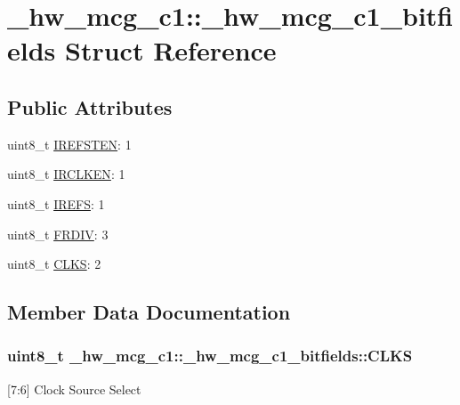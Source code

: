 \hypertarget{struct__hw__mcg__c1_1_1__hw__mcg__c1__bitfields}{}\section{\+\_\+hw\+\_\+mcg\+\_\+c1\+:\+:\+\_\+hw\+\_\+mcg\+\_\+c1\+\_\+bitfields Struct Reference}
\label{struct__hw__mcg__c1_1_1__hw__mcg__c1__bitfields}
\subsection*{Public Attributes}
\begin{DoxyCompactItemize}
\item 
uint8\+\_\+t \hyperlink{struct__hw__mcg__c1_1_1__hw__mcg__c1__bitfields_ac52aec473d5ce4658b1065a251a141a9}{I\+R\+E\+F\+S\+T\+EN}\+: 1
\item 
uint8\+\_\+t \hyperlink{struct__hw__mcg__c1_1_1__hw__mcg__c1__bitfields_a94895970d606eb7fe932690bb7e15215}{I\+R\+C\+L\+K\+EN}\+: 1
\item 
uint8\+\_\+t \hyperlink{struct__hw__mcg__c1_1_1__hw__mcg__c1__bitfields_ab02dab18adb0d367851196f271c603f3}{I\+R\+E\+FS}\+: 1
\item 
uint8\+\_\+t \hyperlink{struct__hw__mcg__c1_1_1__hw__mcg__c1__bitfields_ab887d1778352d8a2ca2ca5bfde5234c3}{F\+R\+D\+IV}\+: 3
\item 
uint8\+\_\+t \hyperlink{struct__hw__mcg__c1_1_1__hw__mcg__c1__bitfields_a9b0233157186c45e201ebe800772f6e3}{C\+L\+KS}\+: 2
\end{DoxyCompactItemize}


\subsection{Member Data Documentation}
\subsubsection[{\texorpdfstring{C\+L\+KS}{CLKS}}]{\setlength{\rightskip}{0pt plus 5cm}uint8\+\_\+t \+\_\+hw\+\_\+mcg\+\_\+c1\+::\+\_\+hw\+\_\+mcg\+\_\+c1\+\_\+bitfields\+::\+C\+L\+KS}\hypertarget{struct__hw__mcg__c1_1_1__hw__mcg__c1__bitfields_a9b0233157186c45e201ebe800772f6e3}{}\label{struct__hw__mcg__c1_1_1__hw__mcg__c1__bitfields_a9b0233157186c45e201ebe800772f6e3}
\mbox{[}7\+:6\mbox{]} Clock Source Select 
